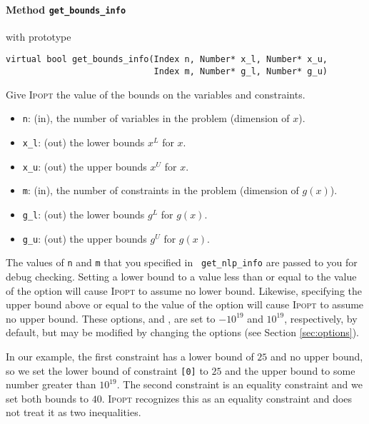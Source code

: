 \documentclass[10pt]{article}
\newcommand{\Ipopt}{\textsc{Ipopt}\xspace}
\begin{document}
\paragraph{Method {\texttt{get\_bounds\_info}}} with prototype
\begin{verbatim}
virtual bool get_bounds_info(Index n, Number* x_l, Number* x_u,
                             Index m, Number* g_l, Number* g_u)
\end{verbatim}
Give \Ipopt the value of the bounds on the variables and constraints.
\begin{itemize}
\item {\tt n}: (in), the number of variables in the problem (dimension of $x$). 
\item {\tt x\_l}: (out) the lower bounds $x^L$ for $x$. 
\item {\tt x\_u}: (out) the upper bounds $x^U$ for $x$.
\item {\tt m}: (in), the number of constraints in the problem (dimension of $g(x)$).
\item {\tt g\_l}: (out) the lower bounds $g^L$ for $g(x)$. 
\item {\tt g\_u}: (out) the upper bounds $g^U$ for $g(x)$.
\end{itemize}
The values of {\tt n} and {\tt m} that you specified in {\tt
  get\_nlp\_info} are passed to you for debug checking.  Setting a
lower bound to a value less than or equal to the value of the option
 will
cause \Ipopt to assume no lower bound. Likewise, specifying the upper
bound above or equal to the value of the option
 will cause \Ipopt to
assume no upper bound.  These options,
and ,
are set to $-10^{19}$ and $10^{19}$,
respectively, by default, but may be modified by changing the options
(see Section \ref{sec:options}).

In our example, the first constraint has a lower bound of $25$ and no upper
bound, so we set the lower bound of constraint {\tt [0]} to $25$ and
the upper bound to some number greater than $10^{19}$. The second
constraint is an equality constraint and we set both bounds to
$40$. \Ipopt recognizes this as an equality constraint and does not
treat it as two inequalities.
\end{document}
